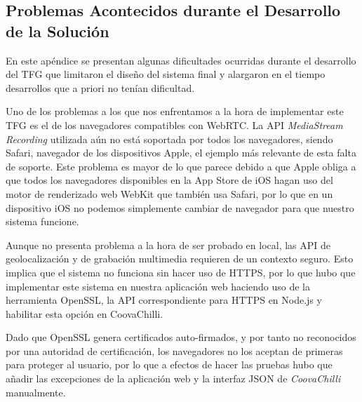 \begin{appendices}
\cleardoublepage
{}%
\begin{center}
\begin{minipage}{.75\textwidth}
\section{Problemas Acontecidos durante el Desarrollo de la Solución}\label{ApendiceE}

En este apéndice se presentan algunas dificultades ocurridas durante el desarrollo del TFG que limitaron el diseño del sistema final y alargaron en el tiempo desarrollos que a priori no tenían dificultad.
\end{minipage}
\end{center}
\clearpage%

Uno de los problemas a los que nos enfrentamos a la hora de implementar este TFG es el de los navegadores compatibles con WebRTC. La API \emph{MediaStream Recording} utilizada aún no está soportada por todos los navegadores, siendo Safari, navegador de los dispositivos Apple, el ejemplo más relevante de esta falta de soporte. Este problema es mayor de lo que parece debido a que Apple obliga a que todos los navegadores disponibles en la App Store de iOS hagan uso del motor de renderizado web WebKit que también usa Safari, por lo que en un dispositivo iOS no podemos simplemente cambiar de navegador para que nuestro sistema funcione.

Aunque no presenta problema a la hora de ser probado en local, las API de geolocalización y de grabación multimedia requieren de un contexto seguro. Esto implica que el sistema no funciona sin hacer uso de HTTPS, por lo que hubo que implementar este sistema en nuestra aplicación web haciendo uso de la herramienta OpenSSL, la API correspondiente para \acrshort{HTTPS} en Node.js y habilitar esta opción en CoovaChilli.

Dado que OpenSSL genera certificados auto-firmados, y por tanto no reconocidos por una autoridad de certificación, los navegadores no los aceptan de primeras para proteger al usuario, por lo que a efectos de hacer las pruebas hubo que añadir las excepciones de la aplicación web y la interfaz JSON de \emph{CoovaChilli} manualmente.


\end{appendices}
